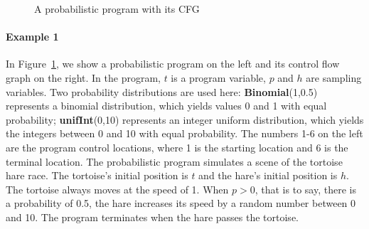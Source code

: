 \documentclass[runningheads]{llncs}
\begin{document}
\begin{figure}[htbp]
	\vspace{-0.5cm}  %
	\centering %
	\caption{A probabilistic program with its CFG} %
	\label{example1} %
\end{figure}

\paragraph{Example 1} In Figure~\ref{example1}, we show a probabilistic program on the left and its control flow graph on the right. In the program,  $t$ is a program variable,  $p$ and $h$ are sampling variables. Two probability distributions are used here: \textbf{Binomial}(1,0.5) represents a binomial distribution, which yields values 0 and 1 with equal probability; \textbf{unifInt}(0,10) represents an integer uniform distribution, which yields the integers between 0 and 10  with equal probability. The numbers 1-6 on the left are the program control locations, where 1 is the starting location and 6 is the terminal location. The probabilistic program simulates a scene of the tortoise hare race. The tortoise's initial position is $t$ and the hare's initial position is $h$.  The tortoise  always moves at the speed of 1. When $p>0$, that is to say, there is a probability of 0.5, the hare increases its speed by a random number between 0 and 10. The program terminates when the hare passes the tortoise.
\end{document}
